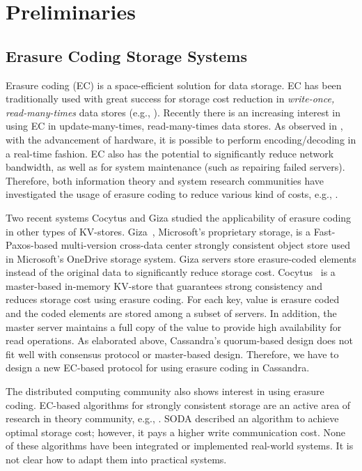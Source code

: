 \section{Preliminaries}

\subsection{Erasure Coding Storage Systems}
Erasure coding (EC) is a space-efficient solution for data storage. 
EC has been traditionally used with great success for storage cost reduction in \textit{write-once, read-many-times} data stores (e.g., \cite{rashmi_fast15, dimakis2011survey, sathiamoorthy, HuaSimXu_etal_azure, DepSky}). Recently there is an increasing interest in using EC in update-many-times, read-many-times data stores. As observed in \cite{Cocytus2016,GIZA2017}, with the advancement of hardware, it is possible to perform encoding/decoding in a real-time fashion.
EC also has the potential to significantly reduce network bandwidth, as well as for system maintenance (such as repairing failed servers).
Therefore, both information theory and system research communities have investigated the usage of erasure coding to reduce various kind of costs, e.g., \cite{dimakis2010network, rashmi2016ec, tamo2014family}.

Two recent systems Cocytus \cite{Cocytus2016} and Giza \cite{GIZA2017} studied the applicability of erasure coding in other types of KV-stores. 
Giza~\cite{GIZA2017}, Microsoft's proprietary storage,  is a Fast-Paxos-based  multi-version cross-data center strongly consistent object store used in Microsoft's OneDrive storage system. Giza servers store erasure-coded elements instead of the original data to significantly reduce storage cost. 
Cocytus~\cite{Cocytus2016} is a master-based in-memory KV-store that guarantees strong consistency and reduces storage cost using erasure coding.  For each key,  value is erasure coded and the coded elements are stored among a subset of servers. In addition, the master server maintains a full copy of the value to provide high availability for read operations. 
As elaborated above, Cassandra's quorum-based design does not fit well with consensus protocol or master-based design.
Therefore, we have to design a new EC-based protocol for using erasure coding in Cassandra.

The distributed computing community also shows interest in using erasure coding.
EC-based algorithms for strongly consistent storage are an active area of research in theory community, e.g., \cite{CadambeLMM17, SODA2016, LDS2017, NicolaouC0KML19}.  SODA\cite{SODA2016} described an algorithm to achieve optimal storage cost; however, it pays a 
higher write communication cost. 
None of these algorithms have been integrated or implemented real-world systems. It is not clear how to adapt them into practical systems.


